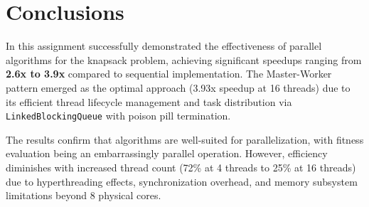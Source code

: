 \chapter{Conclusions} \label{cap:conclusions}

In this assignment successfully demonstrated the effectiveness of parallel algorithms for the knapsack problem, achieving significant speedups ranging from \textbf{2.6x to 3.9x} compared to sequential implementation. The Master-Worker pattern emerged as the optimal approach (3.93x speedup at 16 threads) due to its efficient thread lifecycle management and task distribution via \texttt{LinkedBlockingQueue} with poison pill termination.

The results confirm that algorithms are well-suited for parallelization, with fitness evaluation being an embarrassingly parallel operation. However, efficiency diminishes with increased thread count (72\% at 4 threads to 25\% at 16 threads) due to hyperthreading effects, synchronization overhead, and memory subsystem limitations beyond 8 physical cores.

